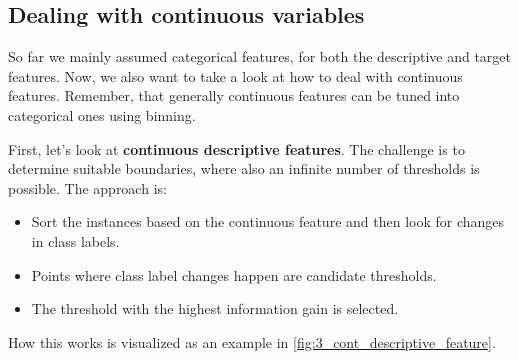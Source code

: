 \subsection{Dealing with continuous variables}
So far we mainly assumed categorical features, for both the descriptive and target features. Now, we also want to take a look at how to deal with continuous features. Remember, that generally continuous features can be tuned into categorical ones using binning.

First, let's look at \textbf{continuous descriptive features}. The challenge is to determine suitable boundaries, where also an infinite number of thresholds is possible. The approach is:
\begin{itemize}
  \item Sort the instances based on the continuous feature and then look for changes in class labels.
  \item Points where class label changes happen are candidate thresholds.
  \item The threshold with the highest information gain is selected.
\end{itemize}

How this works is visualized as an example in \ref{fig:3_cont_descriptive_feature}.

